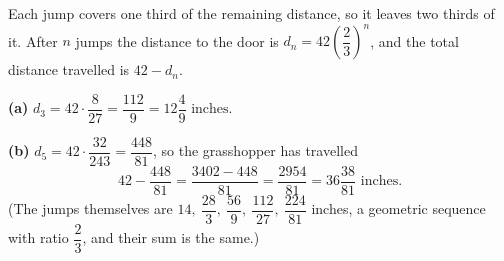 Each jump covers one third of the remaining distance, so it leaves two thirds of it. After $n$ jumps the distance to the door is $d_n=42\left(\dfrac{2}{3}\right)^n$, and the total distance travelled is $42-d_n$.

\textbf{(a)} $d_3=42\cdot\dfrac{8}{27}=\dfrac{112}{9}=\boxed{12\dfrac{4}{9}\text{ inches}}$.

\textbf{(b)} $d_5=42\cdot\dfrac{32}{243}=\dfrac{448}{81}$, so the grasshopper has travelled
\[
42-\dfrac{448}{81}=\dfrac{3402-448}{81}=\boxed{\dfrac{2954}{81}=36\dfrac{38}{81}\text{ inches}}.
\]
(The jumps themselves are $14,\ \dfrac{28}{3},\ \dfrac{56}{9},\ \dfrac{112}{27},\ \dfrac{224}{81}$ inches, a geometric sequence with ratio $\dfrac{2}{3}$, and their sum is the same.)
